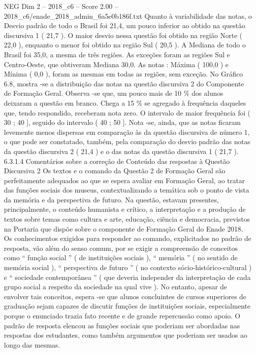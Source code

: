 \begin{textsample}{NEG Dim 2 – 2018\_c6 – Score 2.00 – 2018\_c6/enade\_2018\_admin\_6a5e0b186f.txt}
Quanto à variabilidade das notas, o Desvio padrão de todo o Brasil foi 21,4, um pouco inferior ao obtido na questão discursiva 1 ( 21,7 ).
O maior desvio nessa questão foi obtido na região Norte ( 22,0 ), enquanto o menor foi obtido na região Sul ( 20,5 ).
A Mediana de todo o Brasil foi 35,0, a mesma de três regiões.
As exceções foram as regiões Sul e Centro-Oeste, que obtiveram Mediana 30,0.
As notas : Máxima ( 100,0 ) e Mínima ( 0,0 ), foram as mesmas em todas as regiões, sem exceção.
No Gráfico 6.8, mostra -se a distribuição das notas na questão discursiva 2 do Componente de Formação Geral.
Observa -se que, um pouco mais de 10 \% dos alunos deixaram a questão em branco.
Chega a 15 \% se agregado à frequência daqueles que, tendo respondido, receberam nota zero.
O intervalo de maior frequência foi ( 30 ; 40 ], seguido do intervalo ( 40 ; 50 ].
Nota -se, ainda, que as notas ficaram levemente menos dispersas em comparação às da questão discursiva de número 1, o que pode ser constatado, também, pela comparação do desvio padrão das notas da questão discursiva 2 ( 21,4 ) e o das notas da questão discursiva 1 ( 21,7 ). 6.3.1.4 Comentários sobre a correção de Conteúdo das respostas à Questão Discursiva 2 Os textos e o comando da Questão 2 de Formação Geral são perfeitamente adequados ao que se espera avaliar em Formação Geral, ao tratar das funções sociais dos museus, contextualizando a temática sob o ponto de vista da memória e da perspectiva de futuro.
Na questão, estavam presentes, principalmente, o conteúdo humanista e crítico, a interpretação e a produção de textos sobre temas como cultura e arte, educação, ciência e democracia, previstos na Portaria que dispõe sobre o componente de Formação Geral do Enade 2018.
Os conhecimentos exigidos para responder ao comando, explicitados no padrão de resposta, vão além do senso comum, por se exigir a compreensão de conceitos como “ função social ” ( de instituições sociais ), “ memória ” ( no sentido de memória social ), “ perspectiva de futuro ” ( no contexto sócio-histórico-cultural ) e “ sociedade contemporânea ” ( que deveria independer da interpretação de cada grupo social a respeito da sociedade na qual vive ).
No entanto, apesar de envolver tais conceitos, espera -se que alunos concluintes de cursos superiores de graduação sejam capazes de discutir funções de instituições sociais, especialmente porque o enunciado trazia fato recente e de grande repercussão como apoio.
O padrão de resposta elencou as funções sociais que poderiam ser abordadas nas respostas dos estudantes, como também argumentos que poderiam ser usados ao longo das mesmas.

\end{textsample}
